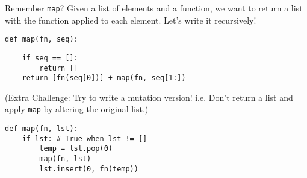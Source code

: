 \question Remember {\tt map}? Given a list of elements and a function, we want
to return a list with the function applied to each element.  Let's write it
recursively!

\begin{lstlisting}
def map(fn, seq):
\end{lstlisting}
\begin{solution}[.9in]
\begin{lstlisting}
    if seq == []:
        return []
    return [fn(seq[0])] + map(fn, seq[1:])
\end{lstlisting}
\end{solution}

(Extra Challenge: Try to write a mutation version! i.e. Don't return a list and
apply {\tt map} by altering the original list.)

\begin{solution}
\begin{lstlisting}
def map(fn, lst):
    if lst: # True when lst != []
        temp = lst.pop(0)
        map(fn, lst)
        lst.insert(0, fn(temp))
\end{lstlisting}
\end{solution}
